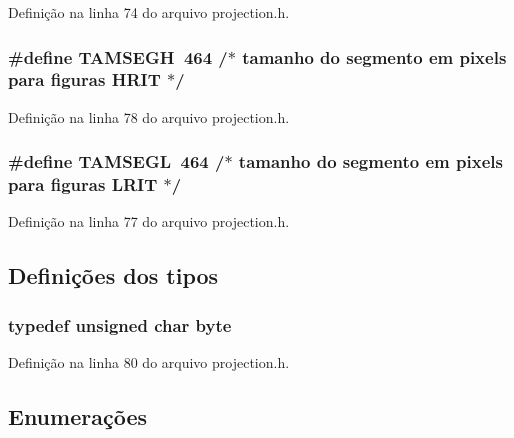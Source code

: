 Definição na linha 74 do arquivo projection.\+h.

\subsubsection[{T\+A\+M\+S\+E\+GH}]{\setlength{\rightskip}{0pt plus 5cm}\#define T\+A\+M\+S\+E\+GH~464               /$\ast$ tamanho do segmento em pixels para figuras H\+R\+IT  $\ast$/}\label{group___network_ga1be6923b9a8c661cc95dac55074f9651}


Definição na linha 78 do arquivo projection.\+h.

\subsubsection[{T\+A\+M\+S\+E\+GL}]{\setlength{\rightskip}{0pt plus 5cm}\#define T\+A\+M\+S\+E\+GL~464               /$\ast$ tamanho do segmento em pixels para figuras L\+R\+IT  $\ast$/}\label{group___network_ga881b683bf2175f9c90054cf29b067d33}


Definição na linha 77 do arquivo projection.\+h.



\subsection{Definições dos tipos}
\subsubsection[{byte}]{\setlength{\rightskip}{0pt plus 5cm}typedef unsigned char {\bf byte}}\label{group___network_ga0c8186d9b9b7880309c27230bbb5e69d}


Definição na linha 80 do arquivo projection.\+h.



\subsection{Enumerações}
